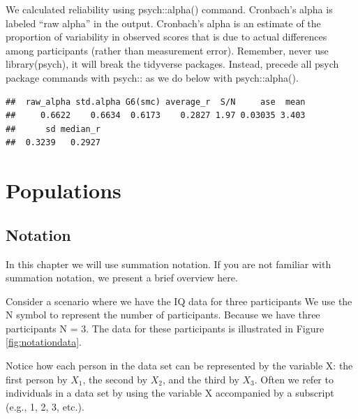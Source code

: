\documentclass[
]{krantz}
\makeatletter
\newenvironment{Shaded}{\begin{snugshade}}{\end{snugshade}}
\newcommand{\KeywordTok}[1]{\textcolor[rgb]{0.27,0.27,0.27}{\textbf{#1}}}
\newcommand{\NormalTok}[1]{#1}
\newcommand{\OperatorTok}[1]{\textcolor[rgb]{0.43,0.43,0.43}{\textbf{#1}}}
\newcommand{\StringTok}[1]{\textcolor[rgb]{0.5,0.5,0.5}{#1}}
\newenvironment{kframe}{%
\medskip{}
\setlength{\fboxsep}{.8em}
 \def\at@end@of@kframe{}%
 \ifinner\ifhmode%
  \def\at@end@of@kframe{\end{minipage}}%
  \begin{minipage}{\columnwidth}%
 \fi\fi%
 \def\FrameCommand##1{\hskip\@totalleftmargin \hskip-\fboxsep
 \colorbox{shadecolor}{##1}\hskip-\fboxsep
     \hskip-\linewidth \hskip-\@totalleftmargin \hskip\columnwidth}%
 \MakeFramed {\advance\hsize-\width
   \@totalleftmargin\z@ \linewidth\hsize
   \@setminipage}}%
 {\par\unskip\endMakeFramed%
 \at@end@of@kframe}
\renewenvironment{Shaded}{\begin{kframe}}{\end{kframe}}
\makeatother
\begin{document}
We calculated reliability using psych::alpha() command. Cronbach's alpha is labeled ``raw alpha'' in the output. Cronbach's alpha is an estimate of the proportion of variability in observed scores that is due to actual differences among participants (rather than measurement error). Remember, never use library(psych), it will break the tidyverse packages. Instead, precede all psych package commands with psych:: as we do below with psych::alpha().

\begin{Shaded}
\end{Shaded}

\begin{verbatim}
##  raw_alpha std.alpha G6(smc) average_r  S/N     ase  mean
##     0.6622    0.6634  0.6173    0.2827 1.97 0.03035 3.403
##      sd median_r
##  0.3239   0.2927
\end{verbatim}

\hypertarget{populations}{%
\chapter{Populations}\label{populations}}

\hypertarget{notation}{%
\section{Notation}\label{notation}}

In this chapter we will use summation notation. If you are not familiar with summation notation, we present a brief overview here.

Consider a scenario where we have the IQ data for three participants We use the N symbol to represent the number of participants. Because we have three participants N = 3. The data for these participants is illustrated in Figure \ref{fig:notationdata}.

Notice how each person in the data set can be represented by the variable X: the first person by \(X_1\), the second by \(X_2\), and the third by \(X_3\). Often we refer to individuals in a data set by using the variable X accompanied by a subscript (e.g., 1, 2, 3, etc.).
\end{document}
